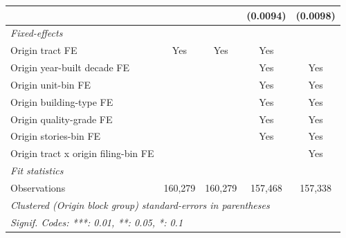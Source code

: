 \begin{tabular}{lcccc}
                                                  &                &                & (0.0094)       & (0.0098)\\   
   \midrule
   \emph{Fixed-effects}\\
   Origin tract FE                                & Yes            & Yes            & Yes            & \\  
   Origin year-built decade FE                    &                &                & Yes            & Yes\\  
   Origin unit-bin FE                             &                &                & Yes            & Yes\\  
   Origin building-type FE                        &                &                & Yes            & Yes\\  
   Origin quality-grade FE                        &                &                & Yes            & Yes\\  
   Origin stories-bin FE                          &                &                & Yes            & Yes\\  
   Origin tract x origin filing-bin FE            &                &                &                & Yes\\  
   \midrule
   \emph{Fit statistics}\\
   Observations                                   & 160,279        & 160,279        & 157,468        & 157,338\\  
   \midrule \midrule
   \multicolumn{5}{l}{\emph{Clustered (Origin block group) standard-errors in parentheses}}\\
   \multicolumn{5}{l}{\emph{Signif. Codes: ***: 0.01, **: 0.05, *: 0.1}}\\
\end{tabular}
\par\endgroup
